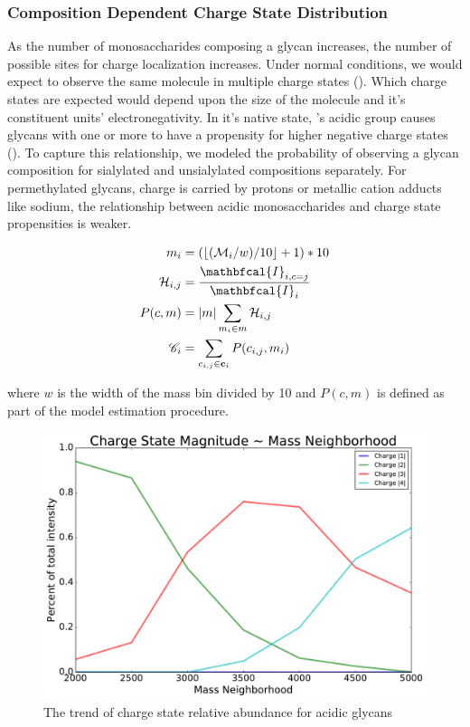 \documentclass{article}
\DeclarePairedDelimiter\floor{\lfloor}{\rfloor}
\begin{document}
    \subsubsection{Composition Dependent Charge State Distribution}
        As the number of monosaccharides composing a glycan increases, the number of possible sites
        for charge localization increases. Under normal conditions, we would expect to observe the
        same molecule in multiple charge states (\cite{Maxwell2012}). Which charge states are
        expected would depend upon the size of the molecule and it's constituent units'
        electronegativity. In it's native state, 's acidic group causes
        glycans with one or more  to have a propensity for higher negative
        charge states (\cite{Varki2009}). To capture this relationship, we modeled the probability of
        observing a glycan composition for sialylated and unsialylated compositions separately. For
        permethylated glycans, charge is carried by protons or metallic cation adducts like sodium,
        the relationship between acidic monosaccharides and charge state propensities is weaker.

        \begin{align}
            m_i &= (\floor*{(\mathcal{M}_i / w) / 10} + 1) * 10 \nonumber\\
            \mathcal{H}_{i,j} &= \frac{
                \mathbfcal{I}_{i, c=j}}{\mathbfcal{I}_i} \nonumber\\
            P(c, m) &= |m|\sum_{m_i \in m} \mathcal{H}_{i, j} \nonumber\\
            \mathscr{C}_i &= \sum_{c_{i, j} \in \mathbf{c}_i}{P(c_{i, j}, m_i)}
        \end{align}

        \noindent where $w$ is the width of the mass bin divided by 10 and $P(c, m)$ is defined as
        part of the model estimation procedure.

        \begin{figure}
            \centering
            \includegraphics[width=0.75\linewidth]{figure/charge_trend_plot}
            \caption{The trend of charge state relative abundance for acidic glycans}
            \label{fig:charge_trend_plot}
        \end{figure}
\end{document}
